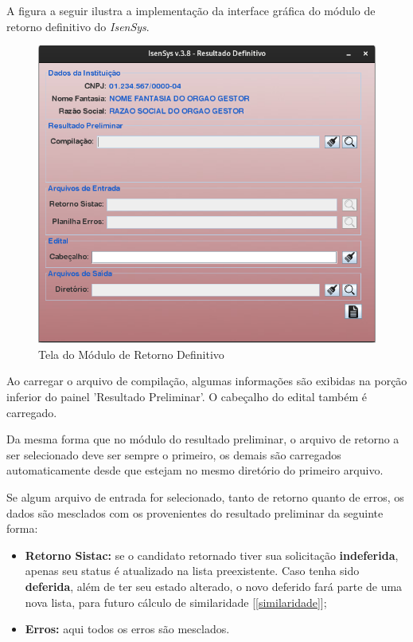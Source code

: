 \documentclass[
	12pt,			%
	openright,		%
	oneside,	
	a4paper,		%
	english,		%
	brazil			%
]{abntex2/abntex2}  %
\begin{document}
					A figura a seguir ilustra a implementação da interface gráfica do módulo de retorno definitivo do \textit{IsenSys}.
	
					\begin{figure}[ht]
						\begin{center}
							
							\caption{Tela do Módulo de Retorno Definitivo}
							\includegraphics[scale=0.45]{img/retorno-def-ui}
							
						\end{center}
					\end{figure}
	
					Ao carregar o arquivo de compilação, algumas informações são exibidas na porção inferior do painel 'Resultado Preliminar'. O cabeçalho do edital também é carregado.
	
					Da mesma forma que no módulo do resultado preliminar, o arquivo de retorno a ser selecionado deve ser sempre o primeiro, os demais são carregados automaticamente desde que estejam no mesmo diretório do primeiro arquivo.
	
					Se algum arquivo de entrada for selecionado, tanto de retorno quanto de erros, os dados são mesclados com os provenientes do resultado preliminar da seguinte forma:
	
					\begin{itemize}
						
						\item \textbf{Retorno Sistac:} se o candidato retornado tiver sua solicitação \textbf{indeferida}, apenas seu status é atualizado na lista preexistente. Caso tenha sido \textbf{deferida}, além de ter seu estado alterado, o novo deferido fará parte de uma nova lista, para futuro cálculo de similaridade [\ref{similaridade}];
						
						\item \textbf{Erros:} aqui todos os erros são mesclados.
						
					\end{itemize}
\end{document}
